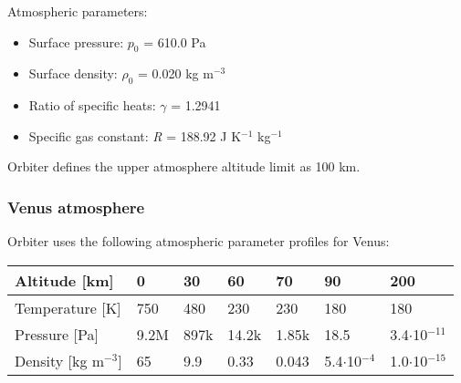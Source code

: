 \documentclass[Orbiter Developer Manual.tex]{subfiles}
\begin{document}
\noindent
\begin{figure}[H]
	\centering
\end{figure}

\noindent
Atmospheric parameters:

\begin{itemize}
\item Surface pressure: $p_{0}$ = 610.0 Pa
\item Surface density: $\rho_{0}$ = 0.020 kg m$^{-3}$
\item Ratio of specific heats: $\gamma$ = 1.2941
\item Specific gas constant: \textit{R} = 188.92 J K$^{-1}$ kg$^{-1}$
\end{itemize}

\noindent
Orbiter defines the upper atmosphere altitude limit as 100 km.


\subsubsection{Venus atmosphere}
Orbiter uses the following atmospheric parameter profiles for Venus:

	\begin{longtable}{ |p{}|p{}|p{}|p{}|p{}|p{}|p{}| }
	\hline\rule{0pt}{2ex}
	Altitude [km] & 0 & 30 & 60 & 70 & 90 & 200\\
	\hline\rule{0pt}{2ex}
	Temperature [K] & 750 & 480 & 230 & 230 & 180 & 180\\
	\hline\rule{0pt}{2ex}
	Pressure [Pa] & 9.2M & 897k & 14.2k & 1.85k & 18.5 & 3.4$\cdot$10$^{-11}$\\
	\hline\rule{0pt}{2ex}
	Density [kg m$^{-3}$] & 65 & 9.9 & 0.33 & 0.043 & 5.4$\cdot$10$^{-4}$ & 1.0$\cdot$10$^{-15}$\\
	\hline
	\end{longtable}

\noindent
\begin{figure}[H]
	\centering
\end{figure}
\end{document}
